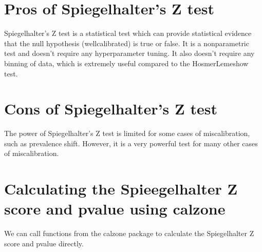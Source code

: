 \documentclass[letterpaper,10pt,english]{sphinxmanual}
\begin{document}
\section{Pros of Spiegelhalter’s Z test}
\label{\detokenize{notebooks/spiegelhalter_z:Pros-of-Spiegelhalter's-Z-test}}
\sphinxAtStartPar
Spiegelhalter’s Z test is a statistical test which can provide statistical evidence that the null hypothesis (well\sphinxhyphen{}calibrated) is true or false. It is a non\sphinxhyphen{}parametric test and doesn’t require any hyperparameter tuning. It also doesn’t require any binning of data, which is extremely useful compared to the Hosmer\sphinxhyphen{}Lemeshow test.


\section{Cons of Spiegelhalter’s Z test}
\label{\detokenize{notebooks/spiegelhalter_z:Cons-of-Spiegelhalter's-Z-test}}
\sphinxAtStartPar
The power of Spiegelhalter’s Z test is limited for some cases of miscalibration, such as prevalence shift. However, it is a very powerful test for many other cases of miscalibration.


\section{Calculating the Spieegelhalter Z score and p\sphinxhyphen{}value using calzone}
\label{\detokenize{notebooks/spiegelhalter_z:Calculating-the-Spieegelhalter-Z-score-and-p-value-using-calzone}}
\sphinxAtStartPar
We can call functions from the calzone package to calculate the Spiegelhalter Z score and p\sphinxhyphen{}value directly.
\end{document}
